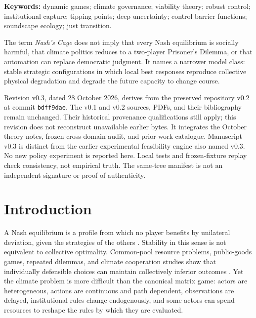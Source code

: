 \documentclass[11pt,a4paper]{article}
\numberwithin{equation}{section}
\theoremstyle{definition}
\theoremstyle{plain}
\theoremstyle{remark}
\begin{document}
\noindent\textbf{Keywords:} dynamic games; climate governance; viability theory; robust control; institutional capture; tipping points; deep uncertainty; control barrier functions; soundscape ecology; just transition.

\vspace{0.8em}
\begin{boundarybox}
The term \emph{Nash's Cage} does not imply that every Nash equilibrium is socially harmful, that climate politics reduces to a two-player Prisoner's Dilemma, or that automation can replace democratic judgment. It names a narrower model class: stable strategic configurations in which local best responses reproduce collective physical degradation and degrade the future capacity to change course.
\end{boundarybox}

\begin{provenancebox}
Revision v0.3, dated 28 October 2026, derives from the preserved repository v0.2 at commit \texttt{bdff9dae}. The v0.1 and v0.2 sources, PDFs, and their bibliography remain unchanged. Their historical provenance qualifications still apply; this revision does not reconstruct unavailable earlier bytes. It integrates the October theory notes, frozen cross-domain audit, and prior-work catalogue. Manuscript v0.3 is distinct from the earlier experimental feasibility engine also named v0.3. No new policy experiment is reported here. Local tests and frozen-fixture replay check consistency, not empirical truth. The same-tree manifest is not an independent signature or proof of authenticity.
\end{provenancebox}

{\small\tableofcontents}
\newpage

\section{Introduction}

A Nash equilibrium is a profile from which no player benefits by unilateral deviation, given the strategies of the others \citep{nash1950}. Stability in this sense is not equivalent to collective optimality. Common-pool resource problems, public-goods games, repeated dilemmas, and climate cooperation studies show that individually defensible choices can maintain collectively inferior outcomes \citep{hardin1968,axelrod1984,ostrom1990,milinski2008,nordhaus2015}. Yet the climate problem is more difficult than the canonical matrix game: actors are heterogeneous, actions are continuous and path dependent, observations are delayed, institutional rules change endogenously, and some actors can spend resources to reshape the rules by which they are evaluated.
\end{document}
